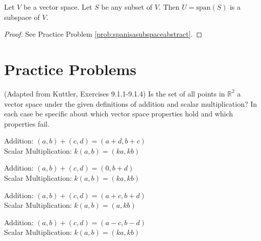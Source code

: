 \documentclass{ximera}
\begin{document}
\begin{theorem}\label{th:spanisasubspaceabstract}
Let $V$ be a vector space.  Let $S$ be any subset of $V$.  Then $U=\mbox{span}(S)$ is a subspace of $V$.
\end{theorem}
\begin{proof}
See Practice Problem \ref{prob:spanisasubspaceabstract}.
\end{proof}

\section*{Practice Problems}
\begin{problem}
(Adapted from Kuttler, Exercises 9.1.1-9.1.4) Is the set of all points in $\mathbb{R}^2$ a vector space under the given definitions of addition and scalar multiplication?    In each case be specific about which vector space properties hold and which properties fail.
  \begin{problem}\label{prob:abstractvectspace1}
  Addition: $(a, b)+(c, d)=(a+d, b+c)$\\ Scalar Multiplication: $k(a, b)=(ka, kb)$
  \end{problem}
  \begin{problem}\label{prob:abstractvectspace2}
  Addition: $(a, b)+(c, d)=(0, b+d)$\\ Scalar Multiplication: $k(a, b)=(ka, kb)$
  \end{problem}
  \begin{problem}\label{prob:abstractvectspace3}
  Addition: $(a, b)+(c, d)=(a+c, b+d)$\\ Scalar Multiplication: $k(a, b)=(a, kb)$
  \end{problem}
  \begin{problem}\label{prob:abstractvectspace4}
  Addition: $(a, b)+(c, d)=(a-c, b-d)$\\ Scalar Multiplication: $k(a, b)=(ka, kb)$
  \end{problem}
  \end{problem}
   
\end{document}
